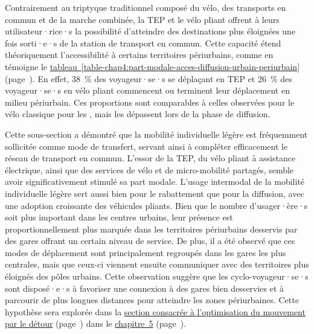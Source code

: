 \begin{refsegment}

Contrairement au triptyque traditionnel composé du vélo, des transports en commun et de la marche combinée, la \acrshort{TEP} et le vélo pliant offrent à leurs utilisateur·rice·s la possibilité d'atteindre des destinations plus éloignées une fois sorti·e·s de la station de transport en commun. Cette capacité étend théoriquement l'accessibilité à certains territoires périurbains, comme en témoigne le \hyperref[table-chap4:part-modale-acces-diffusion-urbain-periurbain]{tableau~\ref{table-chap4:part-modale-acces-diffusion-urbain-periurbain}} (page~\pageref{table-chap4:part-modale-acces-diffusion-urbain-periurbain}). En effet, 38~\% des voyageur·se·s se déplaçant en \acrshort{TEP} et 26~\% des voyageur·se·s en vélo pliant commencent ou terminent leur déplacement en milieu périurbain. Ces proportions sont comparables à celles observées pour le vélo classique pour les , mais les dépassent lors de la phase de diffusion.%

Cette sous-section a démontré que la mobilité individuelle légère est fréquemment sollicitée comme mode de transfert, servant ainsi à compléter efficacement le réseau de transport en commun. L'essor de la \acrshort{TEP}, du vélo pliant à assistance électrique, ainsi que des services de vélo et de micro-mobilité partagés, semble avoir significativement stimulé sa part modale. L'usage intermodal de la mobilité individuelle légère sert aussi bien pour le rabattement que pour la diffusion, avec une adoption croissante des véhicules pliants. Bien que le nombre d'usager·ère·s soit plus important dans les centres urbains, leur présence est proportionnellement plus marquée dans les territoires périurbains desservis par des gares offrant un certain niveau de service. De plus, il a été observé que ces modes de déplacement sont principalement regroupés dans les gares les plus centrales, mais que ceux-ci viennent ensuite communiquer avec des territoires plus éloignés des pôles urbains. Cette observation suggère que les cyclo-voyageur·se·s sont disposé·e·s à favoriser une connexion à des gares bien desservies et à parcourir de plus longues distances pour atteindre les zones périurbaines. Cette hypothèse sera explorée dans la \hyperref[chap5:detours-pauses-optimisation]{section consacrée à l'optimisation du mouvement par le détour} (page~\pageref{chap5:detours-pauses-optimisation}) dans le \hyperref[chap5:titre]{chapitre~5} (page~\pageref{chap5:titre}).%


\end{refsegment}

